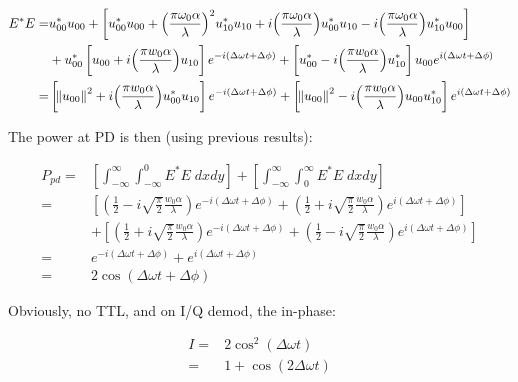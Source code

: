 \documentclass[aps,twoside,secnumarabic,balancelastpage,amsmath,amssymb,nofootinbib,hyperref=pdftex]{revtex4}
\newcommand{\bigfrac}[2]{\Big( \frac{#1}{#2}\Big)}
\begin{document}
\begin{align*}
	E^{*}E = &
    	u_{00}^*u_{00}
		+\left[
			u_{00}^* u_{00} + \bigfrac{\pi \omega_0 \alpha}{\lambda}^2 u_{10}^*u_{10}+ i \bigfrac{\pi \omega_0 \alpha}{\lambda} u_{00}^* u_{10} - i \bigfrac{\pi \omega_0 \alpha}{\lambda} u_{10}^* u_{00} 
		\right]
		\\&
			+ 
			u_{00}^*
			\left[
			u_{00}
 		+
 			i\bigfrac{\pi w_0 \alpha}{\lambda} u_{10}
			\right]
			e^{-i(\Delta \omega t + \Delta \phi)}
		+
			\left[
			u_{00}^*
 -
 i\bigfrac{\pi w_0 \alpha}{\lambda} u_{10}^*
			\right]
			u_{00}
			e^{i(\Delta \omega t + \Delta \phi)}
	\\=&
			\left[
			\norm{u_{00}}^2
 		+
 			i\bigfrac{\pi w_0 \alpha}{\lambda} u_{00}^* u_{10}
			\right]
			e^{-i(\Delta \omega t + \Delta \phi)}
		+
			\left[
			\norm{u_{00}}^2
		 -
 			i\bigfrac{\pi w_0 \alpha}{\lambda} u_{00} u_{10}^*
			\right]
			e^{i(\Delta \omega t + \Delta \phi)}
\end{align*}

The power at PD is then (using previous results):

\begin{align*}
P_{pd} = & 
	\left[
	\int_{-\infty}^{\infty}\int_{-\infty}^{0} E^* E \;			dx dy
	\right]
	 + 
	 \left[
	 \int_{-\infty}^{\infty}\int_{0}^{\infty} E^* E \; 	dx dy
	 \right]
	\\=&
	\left[
	(
		\frac{1}{2}-i\sqrt{\frac{\pi}{2}} \frac{w_0 \alpha}{\lambda} 
		)
		e^{-i(\Delta \omega t + \Delta \phi)}
		+
	(
		\frac{1}{2}+i\sqrt{\frac{\pi}{2}} \frac{w_0 \alpha}{\lambda} 
		)		
		e^{i(\Delta \omega t + \Delta \phi)}			
	\right]
	\\&+
		\left[
	(
		\frac{1}{2}+i\sqrt{\frac{\pi}{2}} \frac{w_0 \alpha}{\lambda} 
		)
		e^{-i(\Delta \omega t + \Delta \phi)}
		+
	(
		\frac{1}{2}-i\sqrt{\frac{\pi}{2}} \frac{w_0 \alpha}{\lambda} 
		)		
		e^{i(\Delta \omega t + \Delta \phi)}			
	\right]
\\=&
	e^{-i(\Delta \omega t + \Delta \phi)}	
	+
	e^{i(\Delta \omega t + \Delta \phi)}	
\\=&
2 \cos (\Delta \omega t + \Delta \phi)
\end{align*}

Obviously, no TTL, and on I/Q demod, the in-phase:

\begin{align*}
I =& 2 \cos^2 (\Delta \omega t)
 \\=& 1 + \cos(2 \Delta \omega t)
\end{align*}
\end{document}
